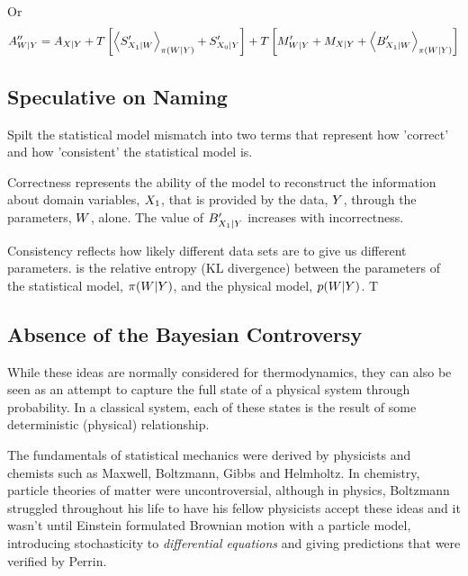 \documentclass[]{article}
\begin{document}
Or 
\[
A^{\prime\prime}_{W|Y} = A_{X|Y} + T\left[\left\langle S^\prime_{X_1 | W} \right\rangle_{\pi(W | Y)} + S^\prime_{X_0|Y}\right]  + T\left[M^\prime_{W|Y} + M_{X|Y} + \left\langle B^\prime_{X_1 | W} \right\rangle_{\pi(W | Y)}\right]
\]

\subsection{Speculative on Naming}

Spilt the statistical model mismatch into two terms that represent how
'correct' and how 'consistent' the statistical model is.

Correctness represents the ability of the model to reconstruct the
information about domain variables, \(X_1\), that is
provided by the data, \(Y\), through the parameters,
\(W\), alone. The value of
\(B^\prime_{X_1|Y}\) increases with
incorrectness.

Consistency reflects how likely different data sets are to give us
different parameters. is the relative entropy (KL divergence) between
the parameters of the statistical model,
\(\pi(W|Y)\), and the physical model,
\(p(W|Y)\). T

\subsection{Absence of the Bayesian
Controversy}\label{absence-of-the-bayesian-controversy}

While these ideas are normally considered for thermodynamics, they can
also be seen as an attempt to capture the full state of a physical
system through probability. In a classical system, each of these states
is the result of some deterministic (physical) relationship.

The fundamentals of statistical mechanics were derived by physicists and
chemists such as Maxwell, Boltzmann, Gibbs and Helmholtz. In chemistry,
particle theories of matter were uncontroversial, although in physics,
Boltzmann struggled throughout his life to have his fellow physicists
accept these ideas and it wasn't until Einstein formulated Brownian
motion with a particle model\cite{Einstein-brownian05}, introducing
stochasticity to \emph{differential equations} and giving predictions
that were verified by Perrin\cite{Perrin-brownian10}.
\end{document}
